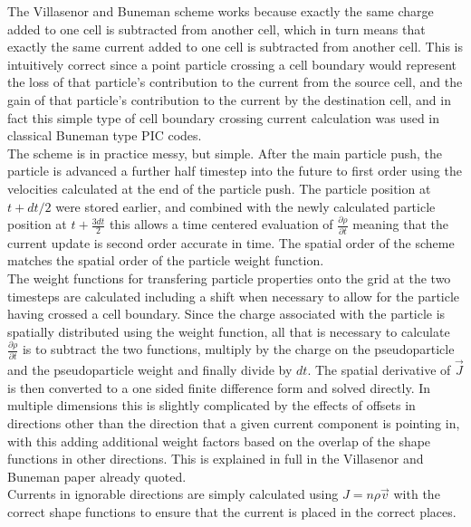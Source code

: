 \documentclass[12pt,a4paper]{article}
\begin{document}
The Villasenor and Buneman scheme works because exactly the same charge added
to one cell is subtracted from another cell, which in turn means that exactly
the same current added to one cell is subtracted from another cell. This is
intuitively correct since a point particle crossing a cell boundary would
represent the loss of that particle's contribution to the current from the
source cell, and the gain of that particle's contribution to the current by the
destination cell, and in fact this simple type of cell boundary crossing
current calculation was used in classical Buneman type PIC codes.\\

The scheme is in practice messy, but simple. After the main particle push, the
particle is advanced a further half timestep into the future to first order
using the velocities calculated at the end of the particle push. The particle
position at $t +dt/2$ were stored earlier, and combined with the newly
calculated particle position at $t+\frac{3dt}{2}$ this allows a time centered
evaluation of $\frac{\partial \rho}{\partial t}$ meaning that the current
update is second order accurate in time. The spatial order of the scheme
matches the spatial order of the particle weight function.\\

The weight functions for transfering particle properties onto the grid at the
two timesteps are calculated including a shift when necessary to allow for the
particle having crossed a cell boundary. Since the charge associated with the
particle is spatially distributed using the weight function, all that is
necessary to calculate $\frac{\partial \rho}{\partial t}$ is to subtract the
two functions, multiply by the charge on the pseudoparticle and the
pseudoparticle weight and finally divide by $dt$. The spatial derivative of
$\vec{J}$ is then converted to a one sided finite difference form and solved
directly. In multiple dimensions this is slightly complicated by the effects of
offsets in directions other than the direction that a given current component
is pointing in, with this adding additional weight factors based on the overlap
of the shape functions in other directions. This is explained in full in the
Villasenor and Buneman paper already quoted.\\

Currents in ignorable directions are simply calculated using $J=n\rho\vec{v}$
with the correct shape functions to ensure that the current is placed in the
correct places.
\end{document}
